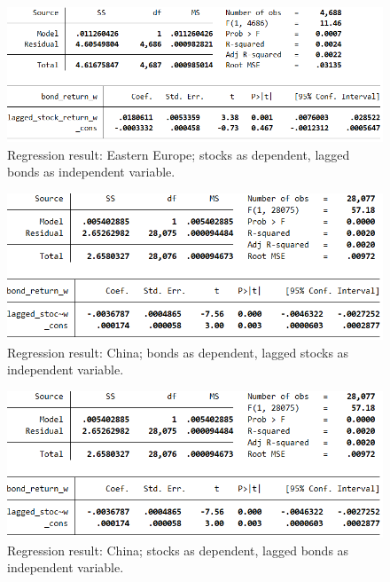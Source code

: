 \begin{figure}[h]
	\centering
	\includegraphics[width=1.0\linewidth]{figures/regression-results/regression-eue-bonds-as-dependent.PNG}
	\caption{Regression result: Eastern Europe; stocks as dependent, lagged bonds as independent variable. }
	\label{fig:regression-eue-stocks-as-dependent}
\end{figure}

\begin{figure}[h]
	\centering
	\includegraphics[width=1.0\linewidth]{figures/regression-results/regression-china-bonds-as-dependent.PNG}
	\caption{Regression result: China; bonds as dependent, lagged stocks as independent variable. }
	\label{fig:regression-china-bonds-as-dependent}
\end{figure}

\begin{figure}[h]
	\centering
	\includegraphics[width=1.0\linewidth]{figures/regression-results/regression-china-bonds-as-dependent.PNG}
	\caption{Regression result: China; stocks as dependent, lagged bonds as independent variable. }
	\label{fig:regression-china-stocks-as-dependent}
\end{figure}

